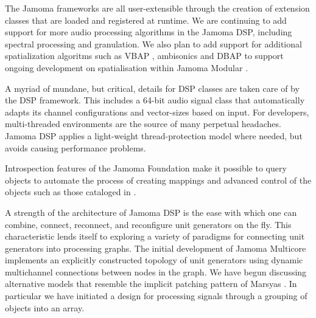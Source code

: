 \documentclass[twoside,10pt]{article}
\begin{document}

The Jamoma frameworks are all user-extensible through the creation of extension classes that are loaded and registered at runtime.  We are continuing to add support for more audio processing algorithms in the Jamoma DSP, including spectral processing and granulation. We also plan to add support for additional spatialization algoritms such as VBAP \cite{Pulkki:1997vbap}, ambisonics \cite{Gerzon:1974surround, Poletti:2000holographic_sound} and DBAP \cite{Lossius:2009} to support ongoing development on spatialisation within Jamoma Modular \cite{Peters:2009}.


A myriad of mundane, but critical, details for DSP classes are taken care of by the DSP framework.  This includes a 64-bit audio signal class that automatically adapts its channel configurations and vector-sizes based on input.  For developers, multi-threaded environments are the source of many perpetual headaches.  Jamoma DSP applies a light-weight thread-protection model where needed, but avoids causing performance problems.  %


Introspection features of the Jamoma Foundation make it possible to query objects to automate the process of creating mappings and advanced control of the objects such as those cataloged in \cite{Pendharkar:2006}.

A strength of the architecture of Jamoma DSP is the ease with which one can combine, connect, reconnect, and reconfigure unit generators on the fly.  This characteristic lends itself to exploring a variety of paradigms for connecting unit generators into processing graphs.  The initial development of Jamoma Multicore implements an explicitly constructed topology of unit generators using dynamic multichannel connections between nodes in the graph.  We have begun discussing alternative models that resemble the implicit patching pattern of Marsyas \cite{Bray:2005}.  In particular we have initiated a design for processing signals through a grouping of objects into an array.
\end{document}
